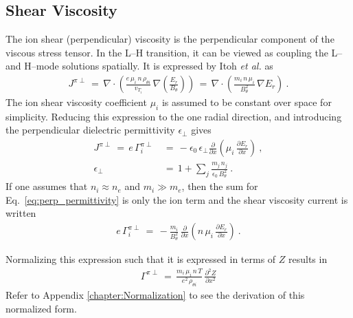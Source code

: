 \subsection{Shear Viscosity}\label{ssec:shear_viscosity}
The ion shear (perpendicular) viscosity is the perpendicular component of the viscous stress tensor.
In the L--H transition, it can be viewed as coupling the L-- and H--mode solutions spatially.
It is expressed by Itoh \emph{et al.} \cite{itoh_elmy_1993} as
\begin{align} %
	J^{\pi\perp} \,=\, \nabla \cdot \left(\frac{e \, \mu_i \, n \, \rho_{\theta i}}
		{v_{T_i}} \, \nabla\left(\frac{E_r}{B_\theta}\right)\right) \,=\,
		\nabla \cdot \left(\frac{m_i \, n \, \mu_i}{B_\theta^2} \,
		\nabla E_r\right)~. \label{eq:shear_visc_current_definition}
\end{align}
The ion shear viscosity coefficient $\mu_i$ is assumed to be constant over space for simplicity.
Reducing this expression to the one radial direction, and introducing the perpendicular dielectric permittivity $\epsilon_\perp$ \cite{kiviniemi_numerical_2001} gives
\begin{align} %
	J^{\pi\perp} \,=\, e\,\Gamma_i^{\pi\perp} \,&=\,
		-\epsilon_0\,\epsilon_\perp \frac{\partial}{\partial x}
		\left(\mu_i \, \frac{\partial E_r}{\partial x}\right)~, \\
	\epsilon_\perp \,&=\, 1 + \sum_j \frac{m_j \, n_j}{\epsilon_0 \, B_\theta^2}~.
		\label{eq:perp_permittivity}
\end{align}
If one assumes that $n_i \approx n_e$ and $m_i \gg m_e$, then the sum for Eq.~\ref{eq:perp_permittivity} is only the ion term and the shear viscosity current is written
\begin{align} %
	e \, \Gamma_i^{\pi\perp} \,=\, -\frac{m_i}{B_\theta^2} \,
		\frac{\partial}{\partial x} \left(n \, \mu_i \,
		\frac{\partial E_r}{\partial x}\right)~. \label{eq:shear_current_E_r}
\end{align}

Normalizing this expression such that it is expressed in terms of $Z$ results in
\begin{align} %
	\Gamma^{\pi\perp} \,=\, \frac{m_i \, \mu_i \, n \, T}{e^2 \, \rho_{\theta i}}
		\, \frac{\partial^2 Z}{\partial x^2} \label{eq:shear_current_Z}
\end{align}
Refer to Appendix \ref{chapter:Normalization} to see the derivation of this normalized form.


